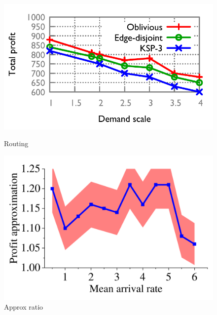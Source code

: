 \documentclass[sigconf]{acmart}
\begin{document}
\begin{figure}[t]
   \begin{minipage}[t]{0.5\linewidth} 
    \centering 
    \includegraphics[width=1.6 in]{fig/evaluation/routing.pdf}
    \caption{Routing} 
    \label{routing-version} 
  \end{minipage}%
   \begin{minipage}[t]{0.5\linewidth} 
    \centering 
    \includegraphics[width=1.6 in]{fig/evaluation/approximation.pdf}
    \caption{Approx ratio} 
    \label{approximation} 
  \end{minipage}
  
\end{figure}



%  
\end{document}
